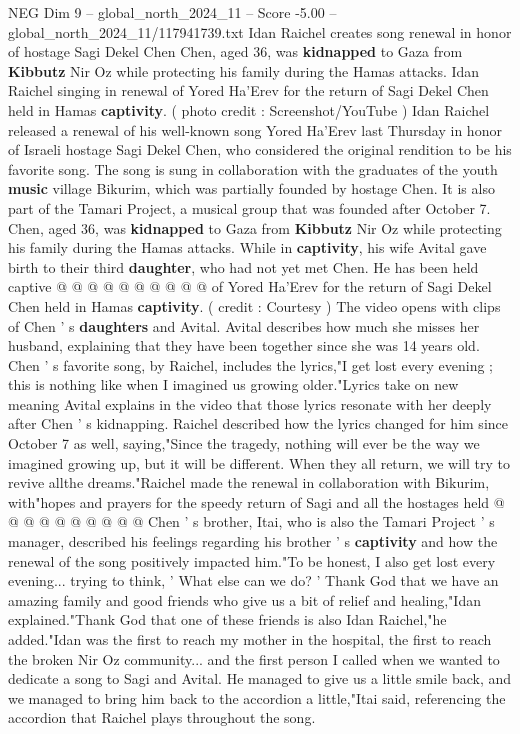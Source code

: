 \begin{textsample}{NEG Dim 9 – global\_north\_2024\_11 – Score -5.00 – global\_north\_2024\_11/117941739.txt}  \label{ex:f9_neg_210}
Idan Raichel creates song renewal in honor of hostage Sagi Dekel Chen Chen, aged 36, was \textbf{kidnapped} to Gaza from \textbf{Kibbutz} Nir Oz while protecting his family during the Hamas attacks.
Idan Raichel singing in renewal of Yored Ha'Erev for the return of Sagi Dekel Chen held in Hamas \textbf{captivity}. ( photo credit : Screenshot/YouTube ) Idan Raichel released a renewal of his well-known song Yored Ha'Erev last Thursday in honor of Israeli hostage Sagi Dekel Chen, who considered the original rendition to be his favorite song.
The song is sung in collaboration with the graduates of the youth \textbf{music} village Bikurim, which was partially founded by hostage Chen.
It is also part of the Tamari Project, a musical group that was founded after October 7.
Chen, aged 36, was \textbf{kidnapped} to Gaza from \textbf{Kibbutz} Nir Oz while protecting his family during the Hamas attacks.
While in \textbf{captivity}, his wife Avital gave birth to their third \textbf{daughter}, who had not yet met Chen.
He has been held captive @ @ @ @ @ @ @ @ @ @ of Yored Ha'Erev for the return of Sagi Dekel Chen held in Hamas \textbf{captivity}. ( credit : Courtesy ) The video opens with clips of Chen ' s \textbf{daughters} and Avital.
Avital describes how much she misses her husband, explaining that they have been together since she was 14 years old.
Chen ' s favorite song, by Raichel, includes the lyrics,"I get lost every evening ; this is nothing like when I imagined us growing older."Lyrics take on new meaning Avital explains in the video that those lyrics resonate with her deeply after Chen ' s kidnapping.
Raichel described how the lyrics changed for him since October 7 as well, saying,"Since the tragedy, nothing will ever be the way we imagined growing up, but it will be different.
When they all return, we will try to revive allthe dreams."Raichel made the renewal in collaboration with Bikurim, with"hopes and prayers for the speedy return of Sagi and all the hostages held @ @ @ @ @ @ @ @ @ @ Chen ' s brother, Itai, who is also the Tamari Project ' s manager, described his feelings regarding his brother ' s \textbf{captivity} and how the renewal of the song positively impacted him."To be honest, I also get lost every evening... trying to think, ' What else can we do? ' Thank God that we have an amazing family and good friends who give us a bit of relief and healing,"Idan explained."Thank God that one of these friends is also Idan Raichel,"he added."Idan was the first to reach my mother in the hospital, the first to reach the broken Nir Oz community... and the first person I called when we wanted to dedicate a song to Sagi and Avital.
He managed to give us a little smile back, and we managed to bring him back to the accordion a little,"Itai said, referencing the accordion that Raichel plays throughout the song.

\end{textsample}
